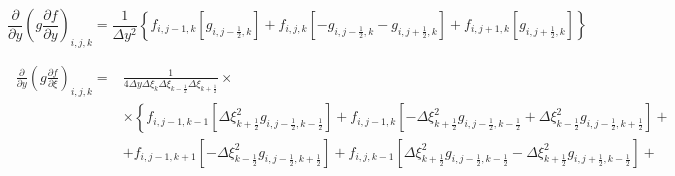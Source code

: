\documentclass[12pt, a4paper]{article}
\newcommand\onehalf{\frac{1}{2}} %
\begin{document}
\begin{equation*}
    \left.
        \frac
            {\partial}
            {\partial y}
        \left(
            g
            \frac
                {\partial f}
                {\partial y}
        \right)
    \right._{i, j, k}
    =
    \frac
        {1}
        {\Delta y^2}
    \left\{
        f_{i, j - 1, k}
        \left[
              g_{i, j - \onehalf, k}
        \right]
        +
        f_{i, j, k}
        \left[
            - g_{i, j - \onehalf, k}
            - g_{i, j + \onehalf, k}
        \right]
        +
        f_{i, j + 1, k}
        \left[
              g_{i, j + \onehalf, k}
        \right]
    \right\}
\end{equation*}

\begin{equation*}
    \begin{split}
        \
        \left.
            \frac
                {\partial}
                {\partial y}
            \left(
                g
                \frac
                    {\partial f}
                    {\partial \xi}
            \right)
        \right._{i, j, k}
        = &
        \frac
            {1}
            {
                4
                \Delta y
                \Delta \xi_{k}
                \Delta \xi_{k - \onehalf}
                \Delta \xi_{k + \onehalf}
            }
        \times
        \\ &
        \times
        \left\{
            f_{i, j - 1, k - 1}
            \left[
                \Delta \xi^2_{k + \onehalf}
                g_{i, j - \onehalf, k - \onehalf}
            \right]
            +
            f_{i, j - 1, k}
            \left[
                -\Delta \xi^2_{k + \onehalf}
                g_{i, j - \onehalf, k - \onehalf}
                +
                \Delta \xi^2_{k - \onehalf}
                g_{i, j - \onehalf, k + \onehalf}
            \right]
            +
        \right.
        \\ &
        \left.
            +
            f_{i, j - 1, k + 1}
            \left[
                - \Delta \xi^2_{k - \onehalf}
                g_{i, j - \onehalf, k + \onehalf}
            \right]
            +
            f_{i, j, k - 1}
            \left[
                \Delta \xi^2_{k + \onehalf}
                g_{i, j - \onehalf, k - \onehalf}
                -
                \Delta \xi^2_{k + \onehalf}
                g_{i, j + \onehalf, k - \onehalf}
            \right]
            +
        \right.
        \\ &
        \left.

\end{split}
\end{equation*}
\end{document}
